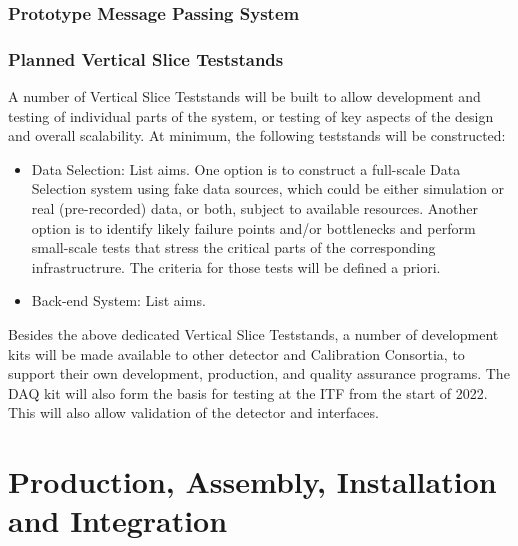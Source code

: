 \subsubsection{Prototype Message Passing System}
\label{sec:fd-daq:validation-demonstrators}


\subsubsection{Planned Vertical Slice Teststands}
\label{sec:sp-daq:validation-demonstrators}

A number of Vertical Slice Teststands will be built to allow
development and testing of individual parts of the  system,
or testing of key aspects of the design and overall scalability. At minimum, the following teststands
will be constructed:
\begin{itemize}
\item Data Selection: List aims. One option is to construct a
  full-scale Data Selection system using fake data 
sources, which could be either simulation or real (pre-recorded)
 data,
or both, subject to available resources. Another option is to identify
likely failure points and/or bottlenecks and perform
small-scale tests that stress the critical parts of the corresponding
infrastructrure. The criteria for those tests will be defined a priori.
\item Back-end System: List aims.
\end{itemize}

Besides the above dedicated Vertical Slice Teststands, a number of
 development kits will be made available to other detector and
Calibration Consortia, to support 
their own development, production, and quality assurance programs. The DAQ
kit will also form the basis for testing at the ITF from the start of 2022. This will
also allow validation of the detector and  interfaces. %

\section{Production, Assembly, Installation and Integration}
\label{sec:sp-daq:production}

